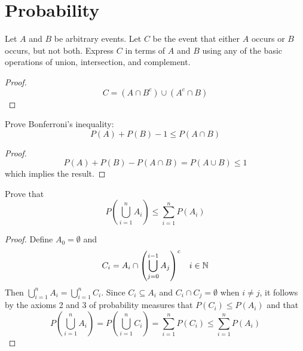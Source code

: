\section{Probability}

\begin{exercise}{5} \label{1.5}
    Let \( A \) and \( B \) be arbitrary events. Let \( C \) be the event that either \( A \) occurs or \( B \) occurs, but not both. Express \( C \) in terms of \( A \) and \( B \) using any of the basic operations of union, intersection, and complement.
    
    \begin{proof}
        \[ C = \left( A \cap B^c \right) \cup \left( A^c \cap B \right) \]
    \end{proof}
\end{exercise}

\begin{exercise}{7} \label{1.7}
    Prove Bonferroni's inequality:
    \[ P(A) + P(B) - 1 \leq P(A \cap B) \]
    
    \begin{proof}
        \[ P(A) + P(B) - P(A \cap B) = P(A \cup B) \leq 1 \]
        which implies the result.
    \end{proof}
\end{exercise}

\begin{exercise}{8} \label{1.8}
    Prove that
    \[ P \left( \bigcup_{i=1}^n A_i\right) \leq \sum_{i=1}^n P(A_i) \]
    
    \begin{proof}
        Define \( A_0 = \emptyset \) and 
        \[ C_i = A_i \cap \left( \bigcup_{j=0}^{i-1} A_j \right)^c \hspace{3mm} i \in \mathbb{N} \]
        Then \( \bigcup_{i=1}^n A_i = \bigcup_{i=1}^n C_i \). Since \( C_i \subseteq A_i \) and \( C_i \cap C_j = \emptyset \) when \( i \neq j \), it follows by the axioms 2 and 3 of probability measures that \( P(C_i) \leq P(A_i) \) and that
        \[ P \left( \bigcup_{i=1}^n A_i\right) = P\left( \bigcup_{i=1}^n C_i \right) = \sum_{i=1}^n P(C_i) \leq \sum_{i=1}^n P(A_i)\]
    \end{proof}
\end{exercise}

